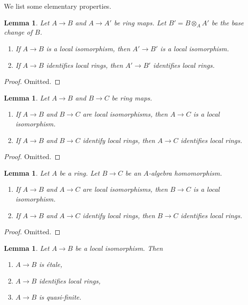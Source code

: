 \documentclass{stacks-project}
\theoremstyle{plain}
\newtheorem{lemma}[subsection]{Lemma}
\theoremstyle{definition}
\theoremstyle{remark}
\numberwithin{equation}{subsection}
\begin{document}
\noindent
We list some elementary properties.

\begin{lemma}
\label{lemma-base-change-local-isomorphism}
Let $A \to B$ and $A \to A'$ be ring maps. Let $B' = B \otimes_A A'$
be the base change of $B$.
\begin{enumerate}
\item If $A \to B$ is a local isomorphism, then $A' \to B'$ is a
local isomorphism.
\item If $A \to B$ identifies local rings, then $A' \to B'$
identifies local rings.
\end{enumerate}
\end{lemma}

\begin{proof}
Omitted.
\end{proof}

\begin{lemma}
\label{lemma-composition-local-isomorphism}
Let $A \to B$ and $B \to C$ be ring maps.
\begin{enumerate}
\item If $A \to B$ and $B \to C$ are local isomorphisms, then $A \to C$
is a local isomorphism.
\item If $A \to B$ and $B \to C$ identify local rings, then $A \to C$
identifies local rings.
\end{enumerate}
\end{lemma}

\begin{proof}
Omitted.
\end{proof}

\begin{lemma}
\label{lemma-local-isomorphism-permanence}
Let $A$ be a ring. Let $B \to C$ be an $A$-algebra homomorphism.
\begin{enumerate}
\item If $A \to B$ and $A \to C$ are local isomorphisms, then $B \to C$
is a local isomorphism.
\item If $A \to B$ and $A \to C$ identify local rings, then $B \to C$
identifies local rings.
\end{enumerate}
\end{lemma}

\begin{proof}
Omitted.
\end{proof}

\begin{lemma}
\label{lemma-local-isomorphism-implies}
Let $A \to B$ be a local isomorphism. Then
\begin{enumerate}
\item $A \to B$ is \'etale,
\item $A \to B$ identifies local rings,
\item $A \to B$ is quasi-finite.
\end{enumerate}
\end{lemma}
\end{document}
